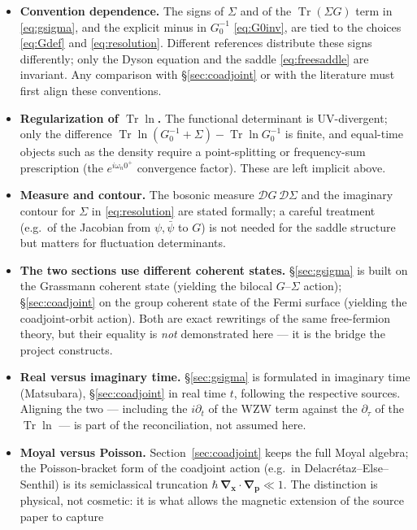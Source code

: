 \documentclass[11pt]{article}
\theoremstyle{remark}
\begin{document}
\begin{itemize}
\item \textbf{Convention dependence.} The signs of $\Sigma$ and of the
$\operatorname{Tr}(\Sigma G)$ term in \eqref{eq:gsigma}, and the explicit minus in $G_0^{-1}$
\eqref{eq:G0inv}, are tied to the choices \eqref{eq:Gdef} and \eqref{eq:resolution}.
Different references distribute these signs differently; only the Dyson equation
and the saddle \eqref{eq:freesaddle} are invariant. Any comparison with
\S\ref{sec:coadjoint} or with the literature must first align these conventions.
\item \textbf{Regularization of $\operatorname{Tr}\ln$.} The functional determinant is
UV-divergent; only the difference $\operatorname{Tr}\ln(G_0^{-1}+\Sigma)-\operatorname{Tr}\ln G_0^{-1}$ is
finite, and equal-time objects such as the density require a point-splitting or
frequency-sum prescription (the $e^{i\omega_n 0^+}$ convergence factor). These are
left implicit above.
\item \textbf{Measure and contour.} The bosonic measure $\mathcal{D}G\,\mathcal{D}\Sigma$
and the imaginary contour for $\Sigma$ in \eqref{eq:resolution} are stated
formally; a careful treatment (e.g.\ of the Jacobian from $\psi,\bar{\psi}$ to $G$) is
not needed for the saddle structure but matters for fluctuation determinants.
\item \textbf{The two sections use different coherent states.} \S\ref{sec:gsigma}
is built on the Grassmann coherent state (yielding the bilocal $G$--$\Sigma$
action); \S\ref{sec:coadjoint} on the group coherent state of the Fermi surface
(yielding the coadjoint-orbit action). Both are exact rewritings of the same
free-fermion theory, but their equality is \emph{not} demonstrated here --- it is
the bridge the project constructs.
\item \textbf{Real versus imaginary time.} \S\ref{sec:gsigma} is formulated in
imaginary time (Matsubara), \S\ref{sec:coadjoint} in real time $t$, following the
respective sources. Aligning the two --- including the $i\partial_t$ of the WZW
term against the $\partial_\tau$ of the $\operatorname{Tr}\ln$ --- is part of the reconciliation,
not assumed here.
\item \textbf{Moyal versus Poisson.} Section~\ref{sec:coadjoint} keeps the full
Moyal algebra; the Poisson-bracket form of the coadjoint action (e.g.\ in
Delacr\'etaz--Else--Senthil) is its semiclassical truncation
$\hbar\,\bm{\nabla}_{\bm{x}}\!\cdot\!\bm{\nabla}_{\bm{p}}\ll1$. The distinction is physical, not
cosmetic: it is what allows the magnetic extension of the source paper to capture

\end{itemize}
\end{document}
